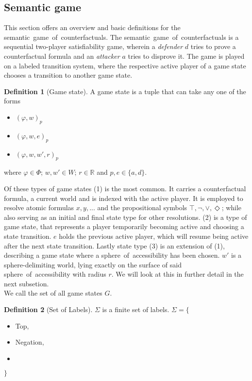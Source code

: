\documentclass[a4paper,american]{paper}
\theoremstyle{definition}\newtheorem{definition}{Definition}
\begin{document}
\subsection{Semantic game}
This section offers an overview and basic definitions for the semantic~game~of~counterfactuals. The semantic~game~of~counterfactuals is a sequential two-player satisfiability game, wherein a \textit{defender} $d$ tries to prove a counterfactual formula and an \textit{attacker} $a$ tries to disprove it. The game is played on a labeled transition system, where the respective active player of a game state chooses a transition to another game state.
\begin{definition}[Game state]
A game state is a tuple that can take any one of the forms
\begin{itemize}
	\item[(1)] $(\varphi ,w)_p$
	\item[(2)] $(\varphi ,w, e)_p$
	\item[(3)] $(\varphi ,w,w',r)_p$
\end{itemize}
where $\varphi\in\Phi$; $w,w'\in W$; $r\in\mathbb{R}$ and $p,e\in\{ a,d\}$.
\end{definition}
\noindent Of these types of game states (1) is the most common. It carries a counterfactual formula, a current world and is indexed with the active player. It is employed to resolve atomic formulas $x,y,...$ and the propositional symbols $\top,\neg,\vee,\Diamond$; while also serving as an initial and final state type for other resolutions. (2) is a type of game state, that represents a player temporarily becoming active and choosing a state transition. $e$ holds the previous active player, which will resume being active after the next state transition. Lastly state type (3) is an extension of (1), describing a game state where a sphere~of~accessibility has been chosen. $w'$ is a sphere-delimiting world, lying exactly on the surface of said sphere~of~accessibility with radius $r$. We will look at this in further detail in the next subsetion.\\
We call the set of all game states $G$.\\
\begin{definition}[Set of Labels]
$\Sigma$ is a finite set of labels. $\Sigma =\{$
\begin{itemize}
	\item Top,
	\item Negation,
	\item
\end{itemize}
$\}$
\end{definition}
\end{document}

